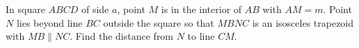 In square $ABCD$ of side $a$, point $M$ is in the interior of $AB$ with $AM=m$. Point $N$ lies beyond line $BC$ outside the square so that $MBNC$ is an isosceles trapezoid with $MB\parallel NC$. Find the distance from $N$ to line $CM$.

